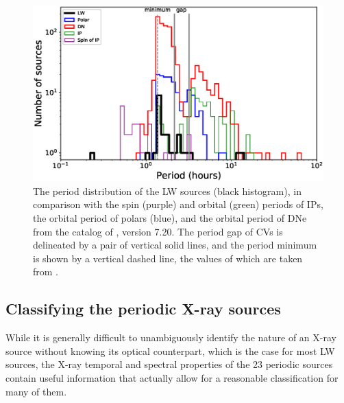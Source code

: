 \documentclass[fleqn,usenatbib]{mnras}
\begin{document}
\begin{figure}
\centering
\includegraphics[scale=0.73]{./figure/CV/N_P.eps}
\caption{The period distribution of the LW sources (black histogram), in comparison with the spin (purple) and orbital (green) periods of IPs, the orbital period of polars (blue), and the orbital period of DNe from the catalog of \citet{2003A&A...404..301R}, version 7.20. The period gap of CVs is delineated by a pair of vertical solid lines, and the period minimum is shown by a vertical dashed line, the values of which are taken from \citet{2011ApJS..194...28K}.\label{fig:N_P}}
\end{figure}

\subsection{Classifying the periodic X-ray sources}
\label{subsec:class}
While it is generally difficult to unambiguously identify the nature of an X-ray source without knowing its optical counterpart, which is the case for most LW sources, the X-ray temporal and spectral properties of the 23 periodic sources contain useful information that actually allow for a reasonable classification for many of them. 
\end{document}
